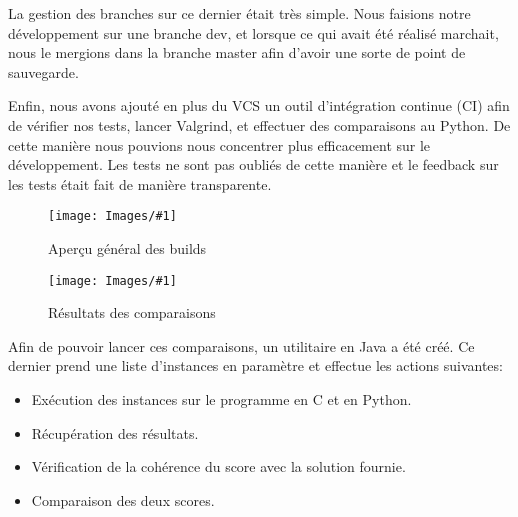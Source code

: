 \documentclass[hideweeklyreports]{polytech/polytech}
\newcommand{\img}[3]{%
	\begin{figure}[H]
		\centering
   		\texttt{[image: Images/\#1]}
  	 	\caption{#2}
	\end{figure}
}
\begin{document}
			La gestion des branches sur ce dernier était très simple. Nous faisions notre développement sur une branche dev, et lorsque ce qui avait été réalisé marchait, nous le mergions dans la branche master afin d'avoir une sorte de point de sauvegarde.
			
			Enfin, nous avons ajouté en plus du VCS un outil d'intégration continue (CI) afin de vérifier nos tests, lancer Valgrind, et effectuer des comparaisons au Python. De cette manière nous pouvions nous concentrer plus efficacement sur le développement. Les tests ne sont pas oubliés de cette manière et le feedback sur les tests était fait de manière transparente.
			\img{TravisAll.png}{Aperçu général des builds}{0.5}
			\img{TravisCompare.png}{Résultats des comparaisons}{0.575}
			
			Afin de pouvoir lancer ces comparaisons, un utilitaire en Java a été créé. Ce dernier prend une liste d'instances en paramètre et effectue les actions suivantes:
			\begin{itemize}
				\item Exécution des instances sur le programme en C et en Python.
				\item Récupération des résultats.
				\item Vérification de la cohérence du score avec la solution fournie.
				\item Comparaison des deux scores.
			\end{itemize}
			
\end{document}

